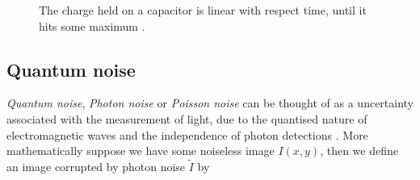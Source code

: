 \documentclass[12pt,twoside,notitlepage]{report}
\begin{document}
            \begin{figure}[H]
                \centering


                \caption{The charge held on a capacitor is linear with respect time, until it hits some maximum \cite{gamal2005cmos}.}
                \label{fig:linear_charge_wrt_photon_rate}
            \end{figure}


        \subsection{Quantum noise} \label{sec:quantum_noise}
            \textit{Quantum noise}, \textit{Photon noise} or \textit{Poisson noise} can be thought of as a uncertainty 
            associated with the measurement of light, due to the quantised nature of electromagnetic waves and the 
            independence of photon detections \cite{hasinoff2014photon}. More mathematically suppose we have some 
            noiseless image $I(x,y)$, then we define an image corrupted by photon noise $\tilde{I}$ by
\end{document}
